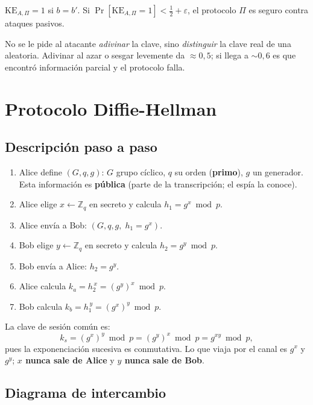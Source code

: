 \documentclass[11pt,a4paper]{article}
\begin{document}
$\mathrm{KE}_{A,\Pi} = 1$ si $b = b'$. Si $\Pr[\mathrm{KE}_{A,\Pi}=1] < \tfrac12 + \varepsilon$,
el protocolo $\Pi$ es seguro contra ataques pasivos.

\begin{destacado}
No se le pide al atacante \emph{adivinar} la clave, sino \emph{distinguir} la clave
real de una aleatoria. Adivinar al azar o sesgar levemente da $\approx 0{,}5$; si
llega a $\sim 0{,}6$ es que encontró información parcial y el protocolo falla.
\end{destacado}

\section{Protocolo Diffie-Hellman}

\subsection{Descripción paso a paso}

\begin{enumerate}[leftmargin=1.6em]
  \item Alice define $(G, q, g)$: $G$ grupo cíclico, $q$ su orden (\textbf{primo}),
        $g$ un generador. Esta información es \textbf{pública} (parte de la
        transcripción; el espía la conoce).
  \item Alice elige $x \leftarrow \mathbb{Z}_q$ en secreto y calcula $h_1 = g^x \bmod p$.
  \item Alice envía a Bob: $(G, q, g,\; h_1 = g^x)$.
  \item Bob elige $y \leftarrow \mathbb{Z}_q$ en secreto y calcula $h_2 = g^y \bmod p$.
  \item Bob envía a Alice: $h_2 = g^y$.
  \item Alice calcula $k_a = h_2^{\,x} = (g^y)^x \bmod p$.
  \item Bob calcula $k_b = h_1^{\,y} = (g^x)^y \bmod p$.
\end{enumerate}

La clave de sesión común es:
\[
  k_s = (g^x)^y \bmod p = (g^y)^x \bmod p = g^{xy} \bmod p,
\]
pues la exponenciación sucesiva es conmutativa. Lo que viaja por el canal es
$g^x$ y $g^y$; \textbf{$x$ nunca sale de Alice} y \textbf{$y$ nunca sale de Bob}.

\subsection{Diagrama de intercambio}
\end{document}
